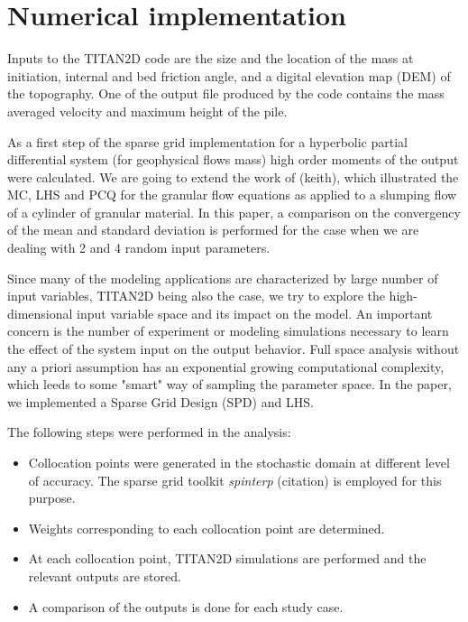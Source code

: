 \documentclass{article}
\begin{document}
\section{Numerical implementation}
Inputs to the TITAN2D code are the size and the location of the mass at 
initiation, internal and bed friction angle, and a digital elevation map (DEM)
of the topography. One of the output file produced by the code contains
the mass averaged velocity and maximum height of the pile.

As a first step of the sparse grid implementation for a hyperbolic partial 
differential system (for geophysical flows mass) high order moments of 
the output were calculated. We are going to extend 
the work of (keith),  which illustrated the MC, LHS and 
PCQ for the granular flow equations as applied to a slumping
flow of a cylinder of granular material.  
In this paper, a comparison on the convergency of the mean and standard
deviation is performed for the case when we are dealing with 2 and 4 random 
input parameters. 


Since many of the modeling applications are characterized by 
large number of input variables, TITAN2D being also the case, we try to
explore the high-dimensional input variable space and its impact on the model.
An important concern is the number of experiment or modeling simulations 
necessary to learn the effect of the system input on the output behavior.
Full space analysis without any a priori assumption has an exponential 
growing computational complexity, which leeds to some "smart" way of sampling
the parameter space. In the paper, we implemented a Sparse Grid Design (SPD) and LHS.

The following steps were performed in the analysis:
\begin{itemize}
\item Collocation points were generated in the stochastic domain
at different level of accuracy. The sparse grid toolkit \textit{spinterp}
(citation) is employed for this purpose.
\item Weights corresponding to each collocation point are determined.
\item At each collocation point, TITAN2D simulations are performed and
the relevant outputs are stored.
\item A comparison of the outputs is done for each study case.  
\end{itemize} 
\end{document}
